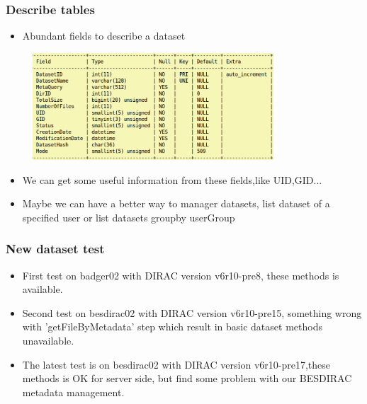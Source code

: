 \documentclass{beamer}
\begin{document}
\begin{frame}
  \frametitle{Describe tables}
  \begin{itemize}
    \item Abundant fields to describe a dataset 
  \end{itemize}
  \hspace{0.5cm} 
  \includegraphics[height=4cm,width=11cm,keepaspectratio]{data/FC_MetaDatasets.png}
  \begin{itemize}
    \item We can get some useful information from these fields,like UID,GID... 
    \item Maybe we can have a better way to manager datasets, list dataset of a specified user or list datasets groupby userGroup
  \end{itemize}
\end{frame}

\begin{frame}
  \frametitle{New dataset test}
  \begin{itemize}
    \item First test on badger02 with DIRAC version v6r10-pre8, these methods is available. 
    \item Second test on besdirac02 with DIRAC version v6r10-pre15, something wrong with 'getFileByMetadata' step which result in basic dataset methods unavailable.
    \item The latest test is on besdirac02 with DIRAC version v6r10-pre17,these methods is OK for server side, but find some problem with our BESDIRAC metadata management.
  \end{itemize}
\end{frame}
\end{document}
